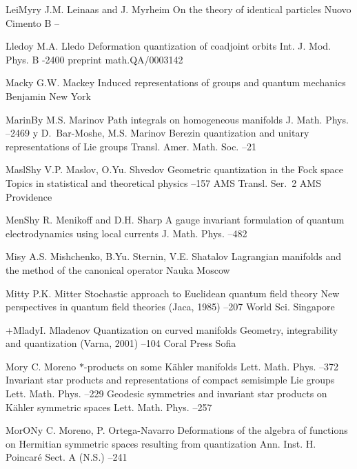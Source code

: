 \documentclass[12pt]{amsart}
\numberwithin{equation}{section}
\theoremstyle{remark}
\newcommand{\by}{\mathbf y}
\begin{document}
\begin{thebibliography}{199}
 LeiMyr\by{ J.M. Leinaas and J. Myrheim \paper On the theory of identical particles
\jour Nuovo Cimento B   --}

 Lledo\by{ M.A. Lledo \paper Deformation quantization of coadjoint orbits
\jour Int. J. Mod. Phys. B    -2400 \paperinfo preprint
math.QA/0003142}

 Mack\by{ G.W. Mackey \book Induced representations of groups and quantum
mechanics \publ Benjamin \publaddr New York }

 MarinB\by{ M.S. Marinov \paper Path integrals on homogeneous manifolds
\jour J. Math. Phys.   --2469 \moreref \by
D.~Bar-Moshe, M.S. Marinov \paper Berezin quantization and unitary
representations of Lie groups \jour Transl. Amer. Math. Soc. 
 --21}

 MaslSh\by{ V.P. Maslov, O.Yu. Shvedov \paper Geometric quantization in
the Fock space \inbook Topics in statistical and theoretical physics --157 \bookinfo AMS Transl. Ser.~2  \publ AMS \publaddr Providence
}

 MenSh\by{ R. Menikoff and D.H. Sharp \paper A gauge invariant formulation
of quantum electrodynamics using local currents
\jour J. Math. Phys.   --482}

 Mis\by{ A.S. Mishchenko, B.Yu. Sternin, V.E. Shatalov \book Lagrangian
manifolds and the method of the canonical operator \publ Nauka \publaddr Moscow
}

 Mitt\by{ P.K. Mitter \paper Stochastic approach to Euclidean quantum
field theory \inbook New perspectives in quantum field theories (Jaca, 1985)
--207 \publ World Sci. \publaddr Singapore }

 +Mlad\by{I. Mladenov \paper Quantization on curved manifolds \inbook
Geometry, integrability and quantization (Varna, 2001) --104 \publ
Coral Press \publaddr Sofia }

 Mor\by{ C. Moreno \paper $*$-products on some K\"ahler manifolds \jour
Lett. Math. Phys.   --372 \moreref \paper Invariant
star products and representations of compact semisimple Lie groups \jour Lett.
Math. Phys.   --229 \moreref \paper Geodesic
symmetries and invariant star products on K\"ahler symmetric spaces \jour Lett.
Math. Phys.   --257}

 MorON\by{ C. Moreno, P. Ortega-Navarro \paper Deformations of the algebra
of functions on Hermitian symmetric spaces resulting from quantization \jour
Ann. Inst. H. Poincar\'e Sect. A (N.S.)   --241}


\end{thebibliography}
\end{document}
